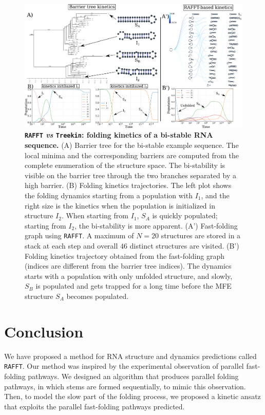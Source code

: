 \begin{figure}[t!]
	\centering
	\includegraphics[width=0.9\linewidth]{../res/images/rafft/kine_bi_sta.png}
	\caption{\label{class_examp}\textbf{\texttt{RAFFT} \emph{vs} \texttt{Treekin}: folding kinetics of a bi-stable RNA sequence.} (A) Barrier tree for the bi-stable example sequence. The local minima and the corresponding barriers are computed from the complete enumeration of the structure space. The bi-stability is visible on the barrier tree through the two branches separated by a high barrier.  (B) Folding kinetics trajectories. The left plot shows the folding dynamics starting from a population with $I_1$, and the right size is the kinetics when the population is initialized in structure $I_2$. When starting from $I_1$, $S_A$ is quickly populated; starting from $I_2$, the bi-stability is more apparent.  (A') Fast-folding graph using \texttt{RAFFT}. A maximum of $N=20$ structures are stored in a stack at each step and overall $46$ distinct structures are visited. (B') Folding kinetics trajectory obtained from the fast-folding graph (indices are different from the barrier tree indices). The dynamics starts with a population with only unfolded structure, and slowly, $S_B$ is populated and gets trapped for a long time before the MFE structure $S_A$ becomes populated.}
\end{figure}

\section{Conclusion}
We have proposed a method for RNA structure and dynamics predictions called \texttt{RAFFT}. Our method was inspired by the experimental observation of parallel fast-folding pathways. We designed an algorithm that produces parallel folding pathways, in which stems are formed sequentially, to mimic this observation. Then, to model the slow part of the folding process, we proposed a kinetic ansatz that exploits the parallel fast-folding pathways predicted.

